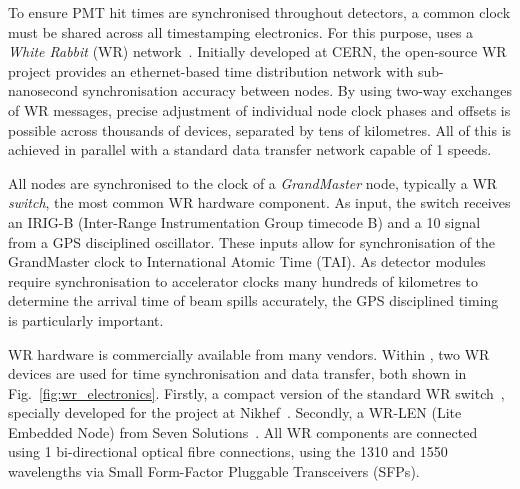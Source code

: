 To ensure PMT hit times are synchronised throughout \chips detectors, a common clock must be
shared across all timestamping electronics. For this purpose, \chips uses a \emph{White Rabbit}
(WR) network~\cite{lipinski2011}. Initially developed at CERN, the open-source WR project provides
an ethernet-based time distribution network with sub-nanosecond synchronisation accuracy between
nodes. By using two-way exchanges of WR messages, precise adjustment of individual node clock
phases and offsets is possible across thousands of devices, separated by tens of kilometres. All
of this is achieved in parallel with a standard data transfer network capable of
\unit{1}{} speeds.

All nodes are synchronised to the clock of a \emph{GrandMaster} node, typically a WR
\emph{switch}, the most common WR hardware component. As input, the switch receives an IRIG-B
(Inter-Range Instrumentation Group timecode B) and a \unit{10}{} signal from a GPS
disciplined oscillator. These inputs allow for synchronisation of the GrandMaster clock to
International Atomic Time (TAI). As \chips detector modules require synchronisation to accelerator
clocks many hundreds of kilometres to determine the arrival time of beam spills accurately, the
GPS disciplined timing is particularly important.

WR hardware is commercially available from many vendors. Within \chipsfive, two WR devices are
used for time synchronisation and data transfer, both shown in Fig.~\ref{fig:wr_electronics}.
Firstly, a compact version of the standard WR switch~\cite{wrswitch2020}, specially developed for
the \chips project at Nikhef~\cite{wrchromium2020}. Secondly, a WR-LEN (Lite Embedded Node) from
Seven Solutions~\cite{wrlen2020}. All WR components are connected using \unit{1}{}
bi-directional optical fibre connections, using the \unit{1310}{} and
\unit{1550}{} wavelengths via Small Form-Factor Pluggable Transceivers (SFPs).

